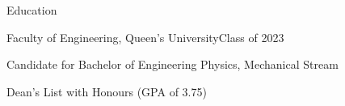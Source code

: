 \documentclass{resume} %
\begin{document}
\begin{rSection}{Education}

\begin{rSubsection}{Faculty of Engineering, Queen's University}{Class of 2023}{}{}
\item Candidate for Bachelor of Engineering Physics, Mechanical Stream
\item Dean's List with Honours (GPA of 3.75)
\end{rSubsection}
\end{rSection}
\end{document}
